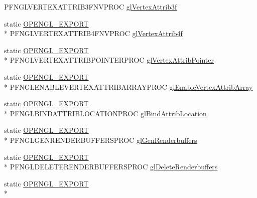 \begin{DoxyCompactItemize}
P\+F\+N\+G\+L\+V\+E\+R\+T\+E\+X\+A\+T\+T\+R\+I\+B3\+F\+N\+V\+P\+R\+O\+C \hyperlink{class_agmd_1_1_g_l_driver_a9c8f362af683929af147788df4c937f2}{gl\+Vertex\+Attrib3f}
\item 
static \hyperlink{_config_8h_a77401aa3bc0a379879047c1bd30f262e}{O\+P\+E\+N\+G\+L\+\_\+\+E\+X\+P\+O\+R\+T} \\*
P\+F\+N\+G\+L\+V\+E\+R\+T\+E\+X\+A\+T\+T\+R\+I\+B4\+F\+N\+V\+P\+R\+O\+C \hyperlink{class_agmd_1_1_g_l_driver_ab1c2da24c1eadd67c8c1dd59f4b3f0c8}{gl\+Vertex\+Attrib4f}
\item 
static \hyperlink{_config_8h_a77401aa3bc0a379879047c1bd30f262e}{O\+P\+E\+N\+G\+L\+\_\+\+E\+X\+P\+O\+R\+T} \\*
P\+F\+N\+G\+L\+V\+E\+R\+T\+E\+X\+A\+T\+T\+R\+I\+B\+P\+O\+I\+N\+T\+E\+R\+P\+R\+O\+C \hyperlink{class_agmd_1_1_g_l_driver_a5cf13627dcc785024d314a3c2397a0e2}{gl\+Vertex\+Attrib\+Pointer}
\item 
static \hyperlink{_config_8h_a77401aa3bc0a379879047c1bd30f262e}{O\+P\+E\+N\+G\+L\+\_\+\+E\+X\+P\+O\+R\+T} \\*
P\+F\+N\+G\+L\+E\+N\+A\+B\+L\+E\+V\+E\+R\+T\+E\+X\+A\+T\+T\+R\+I\+B\+A\+R\+R\+A\+Y\+P\+R\+O\+C \hyperlink{class_agmd_1_1_g_l_driver_aeea9e1eb6802a60e88ddc9b1dec1ff8a}{gl\+Enable\+Vertex\+Attrib\+Array}
\item 
static \hyperlink{_config_8h_a77401aa3bc0a379879047c1bd30f262e}{O\+P\+E\+N\+G\+L\+\_\+\+E\+X\+P\+O\+R\+T} \\*
P\+F\+N\+G\+L\+B\+I\+N\+D\+A\+T\+T\+R\+I\+B\+L\+O\+C\+A\+T\+I\+O\+N\+P\+R\+O\+C \hyperlink{class_agmd_1_1_g_l_driver_a455400c77fe5150921218b2645d7d982}{gl\+Bind\+Attrib\+Location}
\item 
static \hyperlink{_config_8h_a77401aa3bc0a379879047c1bd30f262e}{O\+P\+E\+N\+G\+L\+\_\+\+E\+X\+P\+O\+R\+T} \\*
P\+F\+N\+G\+L\+G\+E\+N\+R\+E\+N\+D\+E\+R\+B\+U\+F\+F\+E\+R\+S\+P\+R\+O\+C \hyperlink{class_agmd_1_1_g_l_driver_ad6a6fa31b768852df072374d8c33e9ca}{gl\+Gen\+Renderbuffers}
\item 
static \hyperlink{_config_8h_a77401aa3bc0a379879047c1bd30f262e}{O\+P\+E\+N\+G\+L\+\_\+\+E\+X\+P\+O\+R\+T} \\*
P\+F\+N\+G\+L\+D\+E\+L\+E\+T\+E\+R\+E\+N\+D\+E\+R\+B\+U\+F\+F\+E\+R\+S\+P\+R\+O\+C \hyperlink{class_agmd_1_1_g_l_driver_a5cd27d325256efb460ad84bc38e5b970}{gl\+Delete\+Renderbuffers}
\item 
static \hyperlink{_config_8h_a77401aa3bc0a379879047c1bd30f262e}{O\+P\+E\+N\+G\+L\+\_\+\+E\+X\+P\+O\+R\+T} \\*

\end{DoxyCompactItemize}
